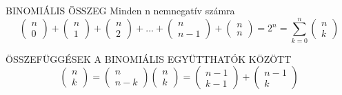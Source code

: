 \begin{tetel}{BINOMIÁLIS ÖSSZEG}
Minden n nemnegatív számra
$$\begin{pmatrix}
n\\0
\end{pmatrix} + \begin{pmatrix}
n\\1
\end{pmatrix} + \begin{pmatrix}
n\\2
\end{pmatrix} + ... + \begin{pmatrix}
n\\n-1
\end{pmatrix} + \begin{pmatrix}
n\\n
\end{pmatrix} = 2^n = \sum_{k = 0}^{n}\begin{pmatrix}
n\\k
\end{pmatrix}$$
\end{tetel}

\begin{tetel}{ÖSSZEFÜGGÉSEK A BINOMIÁLIS EGYÜTTHATÓK KÖZÖTT}
$$\begin{pmatrix}
n\\k
\end{pmatrix} = \begin{pmatrix}
n\\n-k
\end{pmatrix}
\begin{pmatrix}
n\\k
\end{pmatrix} = \begin{pmatrix}
n-1\\k-1
\end{pmatrix} + \begin{pmatrix}
n-1\\k
\end{pmatrix}$$
\end{tetel}
